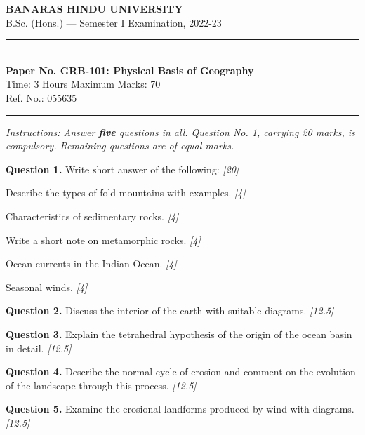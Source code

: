 \documentclass[11pt,a4paper]{article}
\newcommand{\pts}[1]{\hfill   \textit{[#1]}}
\begin{document}
\begin{center}
  {\large\bfseries BANARAS HINDU UNIVERSITY}\\[2pt]
  {\normalsize B.Sc. (Hons.) --- Semester I Examination, 2022-23}\\[6pt]
  \rule{0.8\linewidth}{0.5pt}\\[6pt]
  {\large\bfseries Paper No. GRB-101: Physical Basis of Geography}\\[4pt]
  {\normalsize Time: 3 Hours \hfill Maximum Marks: 70}\\[2pt]
  {\small Ref. No.: 055635}
\end{center}
\rule{\linewidth}{0.4pt}
\smallskip



\noindent   \textit{Instructions: Answer   \textbf{five} questions in all. Question No. 1, carrying 20 marks, is compulsory. Remaining questions are of equal marks.}
\bigskip




\noindent   \textbf{Question 1.} Write short answer of the following: \pts{20}

\begin{parts}
  \item Describe the types of fold mountains with examples. \pts{4}
  \item Characteristics of sedimentary rocks. \pts{4}
  \item Write a short note on metamorphic rocks. \pts{4}
  \item Ocean currents in the Indian Ocean. \pts{4}
  \item Seasonal winds. \pts{4}
\end{parts}

\medskip


\noindent   \textbf{Question 2.} Discuss the interior of the earth with suitable diagrams. \pts{12.5}

\medskip


\noindent   \textbf{Question 3.} Explain the tetrahedral hypothesis of the origin of the ocean basin in detail. \pts{12.5}

\medskip


\noindent   \textbf{Question 4.} Describe the normal cycle of erosion and comment on the evolution of the landscape through this process. \pts{12.5}

\medskip


\noindent   \textbf{Question 5.} Examine the erosional landforms produced by wind with diagrams. \pts{12.5}

\medskip
\end{document}
